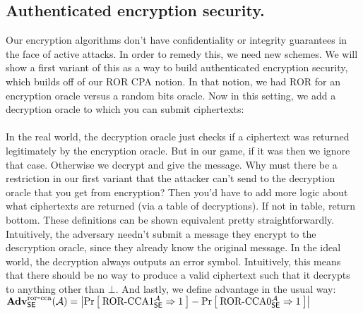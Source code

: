\subsection{Authenticated encryption security.}

Our encryption algorithms don't have confidentiality or integrity guarantees in the face of active attacks. In order to remedy this, we need new schemes.
We will show a first variant of this as a way to build authenticated encryption security, which builds off of our ROR CPA notion.
In that notion, we had ROR for an encryption oracle versus a random bits oracle.
Now in this setting, we add a decryption oracle to which you can submit ciphertexts:\\

\\


In the real world, the decryption oracle just checks if a ciphertext was returned legitimately by the encryption oracle. But in our game, if it was then we ignore that case. Otherwise we decrypt and give the message. Why must there be a restriction in our first variant that the attacker can't send to the decryption oracle that you get from encryption? Then you'd have to add more logic about what ciphertexts are returned (via a table of decryptions). If not in table, return bottom. These definitions can be shown equivalent pretty straightforwardly. Intuitively, the adversary needn't submit a message they encrypt to the descryption oracle, since they already know the original message. In the ideal world, the decryption always outputs an error symbol. Intuitively, this means that there should be no way to produce a valid ciphertext such that it decrypts to anything other than $\bot$. And lastly, we define advantage in the usual way:\\
$\mathbf{Adv}^{\mathrm{ror\mbox{-} cca}}_{{\mathsf{SE}}}({\mathcal A}) = \left|\Pr\left[\: \textnormal{ROR-CCA}1_{\mathsf{SE}}^{\mathcal A}\Rightarrow1 \:\right] - \Pr\left[\: \textnormal{ROR-CCA}0_{\mathsf{SE}}^{\mathcal A}\Rightarrow1 \:\right]\right|$\\

